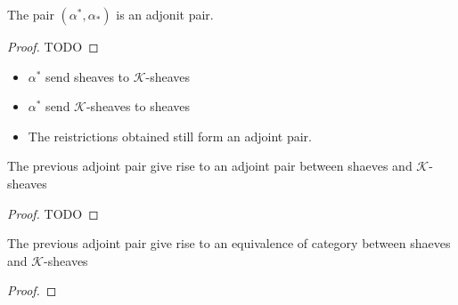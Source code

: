 \begin{proposition}\label{pro:adj_kprshv_and_prshv}
    The pair $(\alpha^*,\alpha_*)$ is an adjonit pair.
\end{proposition}

\begin{proof}
    TODO
\end{proof}

\begin{lemma}\label{lem:adj_kshv_and_shv}
    \begin{itemize}
        \item $\alpha^*$ send sheaves to $\mathcal{K}$-sheaves
        \item $\alpha^*$ send $\mathcal{K}$-sheaves to sheaves
        \item The reistrictions obtained still form an adjoint pair.
    \end{itemize}
    The previous adjoint pair give rise to an adjoint pair between shaeves and $\mathcal{K}$-sheaves
\end{lemma}

\begin{proof}
    TODO
\end{proof}

\begin{lemma}\label{lem:kshv_equiv_shv}
    The previous adjoint pair give rise to an equivalence of category between shaeves and $\mathcal{K}$-sheaves
\end{lemma}

\begin{proof}

\end{proof}